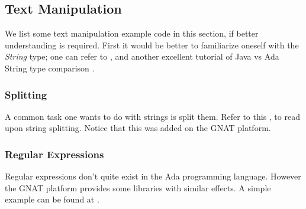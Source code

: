 \subsection{Text Manipulation}
We list some text manipulation example code in this section, if better understanding is required. First it would be better to familiarize oneself with the \textit{String} type; one can refer to \cite{AdaStringType}, and another excellent tutorial of Java vs Ada String type comparison \cite{AdaStringVersusJavaString}.

\subsubsection{Splitting}
A common task one wants to do with strings is split them. Refer to this \cite{AdaStringSplit}, to read upon string splitting. Notice that this was added on the GNAT platform.

\subsubsection{Regular Expressions}
Regular expressions don't quite exist in the Ada programming language. However the GNAT platform provides some libraries with similar effects. A simple example can be found at \cite{AdaRegularExpressions}.



